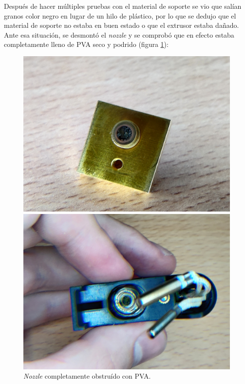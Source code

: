 Después de hacer múltiples pruebas con el material de soporte se vio que salían granos
color negro en lugar de un hilo de plástico, por lo que se dedujo que el material de
soporte no estaba en buen estado o que el extrusor estaba dañado. Ante esa situación,
se desmontó el \textit{nozzle} y se comprobó que en efecto estaba completamente lleno
de \ac{PVA} seco y podrido (figura \ref{fig:nozzle_oof}):

\begin{figure}[H]
    \centering
    \begin{minipage}{.49\linewidth}
        \includegraphics[width=\linewidth]{pictures/clogged_nozzle.jpg}
    \end{minipage}
    \hfill
    \begin{minipage}{.49\linewidth}
        \includegraphics[width=\linewidth]{pictures/nozzle_oof_2.jpg}
    \end{minipage}
    \caption{\textit{Nozzle} completamente obstruído con \ac{PVA}.}        
    \label{fig:nozzle_oof}
\end{figure}


